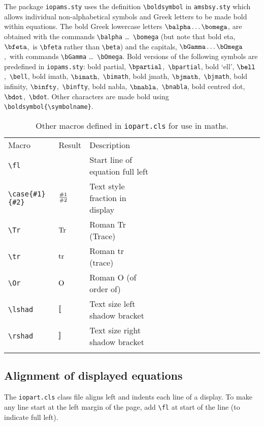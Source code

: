 \documentclass[12pt]{iopart}
\begin{document}
The package \verb"iopams.sty" uses the definition \verb"\boldsymbol" in \verb"amsbsy.sty"
which allows individual non-alphabetical symbols and Greek letters to be
made bold within equations.
The bold Greek lowercase letters \ifiopams$\balpha \ldots\bomega$,\fi
are obtained with the commands
\verb"\balpha" \dots\ \verb"\bomega" (but note that
bold eta\ifiopams, $\bfeta$,\fi\ is \verb"\bfeta" rather than \verb"\beta")
and the capitals\ifiopams, $\bGamma\ldots\bOmega$,\fi\ with commands
\verb"\bGamma" \dots\
\verb"\bOmega". Bold versions of the following symbols are
predefined in \verb"iopams.sty":
bold partial\ifiopams, $\bpartial$,\fi\ \verb"\bpartial",
bold `ell'\ifiopams, $\bell$,\fi\  \verb"\bell",
bold imath\ifiopams, $\bimath$,\fi\  \verb"\bimath",
bold jmath\ifiopams, $\bjmath$,\fi\  \verb"\bjmath",
bold infinity\ifiopams, $\binfty$,\fi\ \verb"\binfty",
bold nabla\ifiopams, $\bnabla$,\fi\ \verb"\bnabla",
bold centred dot\ifiopams, $\bdot$,\fi\  \verb"\bdot". Other
characters are made bold using
\verb"\boldsymbol{\symbolname}".

\begin{table}
\caption{\label{math-tab2}Other macros defined in {\tt iopart.cls} for use in maths.}
\begin{tabular*}{\textwidth}{@{}l*{15}{@{}l}}
\br
Macro&Result&Description\\
\mr
\verb"\fl"&&Start line of equation full left\\
\verb"\case{#1}{#2}"&${\textstyle\frac{\#1}{\#2}}$&Text style fraction in display\\
\verb"\Tr"&$\mathop{\mathrm{Tr}}\nolimits$&Roman Tr (Trace)\\
\verb"\tr"&$\mathop{\mathrm{tr}}\nolimits$&Roman tr (trace)\\
\verb"\Or"&$\mathord{\mathrm{O}}$&Roman O (of order of)\\
\verb"\lshad"&$[\![$&Text size left shadow bracket\\
\verb"\rshad"&$]\!]$&Text size right shadow bracket\\
\br
\end{tabular*}
\end{table}

\subsection{Alignment of displayed equations}

The \verb"iopart.cls" class file aligns left and indents each line of a
display.  To make any line start at the left margin of the page, add
\verb"\fl" at start of the line (to indicate full left).
\end{document}
